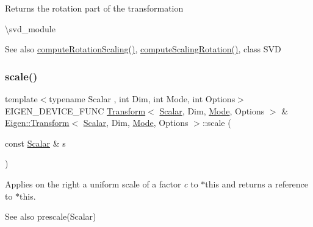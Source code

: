 \begin{DoxyReturn}{Returns}
the rotation part of the transformation
\end{DoxyReturn}
\textbackslash{}svd\+\_\+module

\begin{DoxySeeAlso}{See also}
\mbox{\hyperlink{class_eigen_1_1_transform_aff2a75622ed0a24dbe4bd22e5aeccb78}{compute\+Rotation\+Scaling()}}, \mbox{\hyperlink{class_eigen_1_1_transform_a88f214d6340a4ced22d673d54661e16c}{compute\+Scaling\+Rotation()}}, class S\+VD 
\end{DoxySeeAlso}
\mbox{\label{class_eigen_1_1_transform_a7c4f178cd06d8352607a79804e23d275}} 
\subsubsection{\texorpdfstring{scale()}{scale()}\hspace{0.1cm}{\footnotesize\ttfamily [1/2]}}
{\footnotesize\ttfamily template$<$typename Scalar , int Dim, int Mode, int Options$>$ \\
E\+I\+G\+E\+N\+\_\+\+D\+E\+V\+I\+C\+E\+\_\+\+F\+U\+NC \mbox{\hyperlink{class_eigen_1_1_transform}{Transform}}$<$ \mbox{\hyperlink{class_eigen_1_1_transform_a4e69ced9d651745b8ed4eda46f41795d}{Scalar}}, Dim, \mbox{\hyperlink{struct_mode}{Mode}}, Options $>$ \& \mbox{\hyperlink{class_eigen_1_1_transform}{Eigen\+::\+Transform}}$<$ \mbox{\hyperlink{class_eigen_1_1_transform_a4e69ced9d651745b8ed4eda46f41795d}{Scalar}}, Dim, \mbox{\hyperlink{struct_mode}{Mode}}, Options $>$\+::scale (\begin{DoxyParamCaption}\item[{const \mbox{\hyperlink{class_eigen_1_1_transform_a4e69ced9d651745b8ed4eda46f41795d}{Scalar}} \&}]{s }\end{DoxyParamCaption})\hspace{0.3cm}{\ttfamily [inline]}}

Applies on the right a uniform scale of a factor {\itshape c} to {\ttfamily $\ast$this} and returns a reference to {\ttfamily $\ast$this}. \begin{DoxySeeAlso}{See also}
prescale(\+Scalar) 
\end{DoxySeeAlso}
\mbox{\label{class_eigen_1_1_transform_a9a77912284890d31125834e67c5ba0e7}} 
